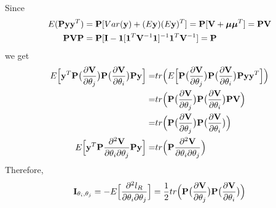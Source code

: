 \documentclass[11pt]{article}
\begin{document}
Since 
\begin{align*}
E({\bf P} {\bf y} {\bf y}^T)&={\bf P} [Var({\bf y})+(E{\bf y})(E{\bf y})^T]={\bf P} [{\bf V}+\boldsymbol{\mu} \boldsymbol{\mu}^T]={\bf P} {\bf V} \\
{\bf P} {\bf V} {\bf P}&={\bf P}[{\bf I}-\mathbf{1}[\mathbf{1}^T{\bf V}^{-1}\mathbf{1}]^{-1}\mathbf{1}^T{\bf V}^{-1}]={\bf P}
\end{align*}
we get
\begin{align*}
E\Big[{\bf y}^T {\bf P}\big(\frac{\partial {\bf V}}{\partial \theta_j}\big){\bf P} \big(\frac{\partial {\bf V}}{\partial \theta_i}\big){\bf P} {\bf y} \Big]=&tr\Big(E\Big[{\bf P}\big(\frac{\partial {\bf V}}{\partial \theta_j}\big){\bf P} \big(\frac{\partial {\bf V}}{\partial \theta_i}\big){\bf P} {\bf y} {\bf y}^T \Big] \Big)\\
=&tr\Big({\bf P}\big(\frac{\partial {\bf V}}{\partial \theta_j}\big){\bf P} \big(\frac{\partial {\bf V}}{\partial \theta_i}\big){\bf P} {\bf V} \Big)\\
=&tr\Big({\bf P}\big(\frac{\partial {\bf V}}{\partial \theta_j}\big){\bf P} \big(\frac{\partial {\bf V}}{\partial \theta_i}\big)\Big)\\
E\Big[{\bf y}^T {\bf P}\frac{\partial^2 {\bf V}}{\partial \theta_i \partial \theta_j}{\bf P} {\bf y} \Big]=&tr\Big({\bf P}\frac{\partial^2 {\bf V}}{\partial \theta_i \partial \theta_j}\Big)
\end{align*}
Therefore, 
\begin{align*}
{\bf I}_{\theta_i, \theta_j}=-E\Big[\frac{\partial^2 l_R}{\partial \theta_i \partial \theta_j}\Big]=\frac{1}{2}tr\Big({\bf P}\big(\frac{\partial {\bf V}}{\partial \theta_j}\big){\bf P} \big(\frac{\partial {\bf V}}{\partial \theta_i}\big)\Big)
\end{align*}



\clearpage



\end{document}
